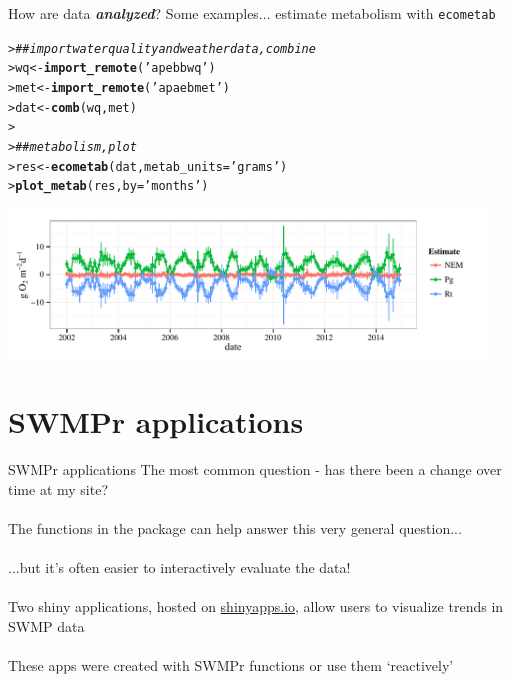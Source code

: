 \documentclass[serif]{beamer}\usepackage[]{graphicx}\usepackage[]{color}
\makeatletter
\newcommand{\hlstr}[1]{\textcolor[rgb]{0.192,0.494,0.8}{#1}}%
\newcommand{\hlcom}[1]{\textcolor[rgb]{0.678,0.584,0.686}{\textit{#1}}}%
\newcommand{\hlstd}[1]{\textcolor[rgb]{0.345,0.345,0.345}{#1}}%
\newcommand{\hlkwb}[1]{\textcolor[rgb]{0.69,0.353,0.396}{#1}}%
\newcommand{\hlkwc}[1]{\textcolor[rgb]{0.333,0.667,0.333}{#1}}%
\newcommand{\hlkwd}[1]{\textcolor[rgb]{0.737,0.353,0.396}{\textbf{#1}}}%
\newenvironment{kframe}{%
 \def\at@end@of@kframe{}%
 \ifinner\ifhmode%
  \def\at@end@of@kframe{\end{minipage}}%
  \begin{minipage}{\columnwidth}%
 \fi\fi%
 \def\FrameCommand##1{\hskip\@totalleftmargin \hskip-\fboxsep
 \colorbox{shadecolor}{##1}\hskip-\fboxsep
     \hskip-\linewidth \hskip-\@totalleftmargin \hskip\columnwidth}%
 \MakeFramed {\advance\hsize-\width
   \@totalleftmargin\z@ \linewidth\hsize
   \@setminipage}}%
 {\par\unskip\endMakeFramed%
 \at@end@of@kframe}
\newenvironment{knitrout}{}{} %
\newcommand{\Bigtxt}[1]{\textbf{\textit{#1}}}
\makeatother
\begin{document}
\begin{frame}[fragile,t]{How are data \Bigtxt{analyzed}?}
Some examples... estimate metabolism with \texttt{ecometab}
\begin{knitrout}\scriptsize
{}\color{fgcolor}\begin{kframe}
\begin{alltt}
\hlstd{> }\hlcom{## import water quality and weather data, combine}
\hlstd{> }\hlstd{wq} \hlkwb{<-} \hlkwd{import_remote}\hlstd{(}\hlstr{'apebbwq'}\hlstd{)}
\hlstd{> }\hlstd{met} \hlkwb{<-} \hlkwd{import_remote}\hlstd{(}\hlstr{'apaebmet'}\hlstd{)}
\hlstd{> }\hlstd{dat} \hlkwb{<-} \hlkwd{comb}\hlstd{(wq, met)}
\hlstd{> }
\hlstd{> }\hlcom{## metabolism, plot}
\hlstd{> }\hlstd{res} \hlkwb{<-} \hlkwd{ecometab}\hlstd{(dat,} \hlkwc{metab_units} \hlstd{=} \hlstr{'grams'}\hlstd{)}
\hlstd{> }\hlkwd{plot_metab}\hlstd{(res,} \hlkwc{by} \hlstd{=} \hlstr{'months'}\hlstd{)}
\end{alltt}
\end{kframe}
\end{knitrout}
\begin{knitrout}
\color{fgcolor}

{\centering \includegraphics[width=0.95\textwidth]{fig//ecometab} 

}



\end{knitrout}
\end{frame}

\section{SWMPr applications}

\begin{frame}{SWMPr applications}
The most common question - has there been a change over time at my site? \\~\\
The functions in the package can help answer this very general question...\\~\\
...but it's often easier to interactively evaluate the data! \\~\\
Two shiny applications, hosted on \href{http://www.shinyapps.io/}{shinyapps.io}, allow users to visualize trends in SWMP data \\~\\
These apps were created with SWMPr functions or use them `reactively'
\end{frame}
\end{document}

